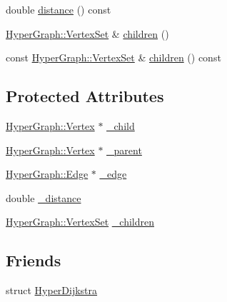 \begin{DoxyCompactItemize}
\item 
double \mbox{\hyperlink{structg2o_1_1_hyper_dijkstra_1_1_adjacency_map_entry_ac7bf36d934980f655f2f8fd04402456b}{distance}} () const
\item 
\mbox{\hyperlink{classg2o_1_1_hyper_graph_a703938cdb4bb636860eed55a2489d70c}{Hyper\+Graph\+::\+Vertex\+Set}} \& \mbox{\hyperlink{structg2o_1_1_hyper_dijkstra_1_1_adjacency_map_entry_aa1a11048612968381db6a0ad525f7e0d}{children}} ()
\item 
const \mbox{\hyperlink{classg2o_1_1_hyper_graph_a703938cdb4bb636860eed55a2489d70c}{Hyper\+Graph\+::\+Vertex\+Set}} \& \mbox{\hyperlink{structg2o_1_1_hyper_dijkstra_1_1_adjacency_map_entry_a1c3f82778c613d6164a5c5013c6e70c7}{children}} () const
\end{DoxyCompactItemize}
\subsection*{Protected Attributes}
\begin{DoxyCompactItemize}
\item 
\mbox{\hyperlink{classg2o_1_1_hyper_graph_1_1_vertex}{Hyper\+Graph\+::\+Vertex}} $\ast$ \mbox{\hyperlink{structg2o_1_1_hyper_dijkstra_1_1_adjacency_map_entry_a7ccdf917414efa537c3942d360ca127a}{\+\_\+child}}
\item 
\mbox{\hyperlink{classg2o_1_1_hyper_graph_1_1_vertex}{Hyper\+Graph\+::\+Vertex}} $\ast$ \mbox{\hyperlink{structg2o_1_1_hyper_dijkstra_1_1_adjacency_map_entry_a3490ab9668c98d3e0cb14c54b9d41747}{\+\_\+parent}}
\item 
\mbox{\hyperlink{classg2o_1_1_hyper_graph_1_1_edge}{Hyper\+Graph\+::\+Edge}} $\ast$ \mbox{\hyperlink{structg2o_1_1_hyper_dijkstra_1_1_adjacency_map_entry_adc56c13a328aac02456474a9e7c72415}{\+\_\+edge}}
\item 
double \mbox{\hyperlink{structg2o_1_1_hyper_dijkstra_1_1_adjacency_map_entry_a95b3db28f32badcdce2edf1bae83b78d}{\+\_\+distance}}
\item 
\mbox{\hyperlink{classg2o_1_1_hyper_graph_a703938cdb4bb636860eed55a2489d70c}{Hyper\+Graph\+::\+Vertex\+Set}} \mbox{\hyperlink{structg2o_1_1_hyper_dijkstra_1_1_adjacency_map_entry_a5b69ff3769d50a3229e2df80cac3f093}{\+\_\+children}}
\end{DoxyCompactItemize}
\subsection*{Friends}
\begin{DoxyCompactItemize}
\item 
struct \mbox{\hyperlink{structg2o_1_1_hyper_dijkstra_1_1_adjacency_map_entry_a358d802df25b35f34e715710d1fa380c}{Hyper\+Dijkstra}}
\end{DoxyCompactItemize}


